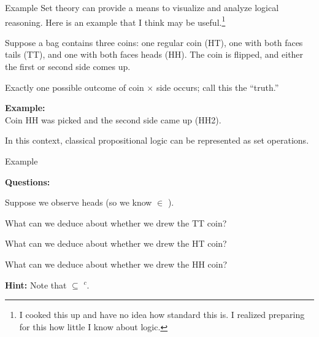 \documentclass[8pt]{beamer}\usepackage[]{graphicx}\usepackage[]{color}
\begin{document}
\begin{frame}{Example}
%
Set theory can provide a means to visualize and analyze logical reasoning.
Here is an example that I think may be useful.\footnote{I cooked this up and
have no idea how standard this is.  I realized preparing for this how
little I know about logic.}


Suppose a bag contains three coins: one regular coin (HT), one with both
faces tails (TT), and one with both faces heads (HH).  The coin is flipped,
and either the first or second side comes up.

Exactly one possible outcome
of coin $\times$ side occurs; call this the ``truth.''

\begin{minipage}{0.38\textwidth}
    \begin{center}
\end{center}
\end{minipage}
\begin{minipage}{0.58\textwidth}
    \textbf{Example:}\\
    Coin HH was picked and the second side came up (HH2).

    \vspace{1em} In this context, classical propositional logic can be
    represented as set operations.
\end{minipage}
%
\end{frame}


\begin{frame}{Example}

\setminipage{}
\pause
\textbf{Questions:}

Suppose we observe heads (so we know \truth{} $\in$ \heads{}).

What can we deduce about whether we drew the TT coin?

What can we deduce about whether we drew the HT coin?

What can we deduce about whether we drew the HH coin?

\textbf{Hint:}
%
Note that \heads{} $\subseteq$ \ttcoin{}$^c$.


\end{frame}
\end{document}
